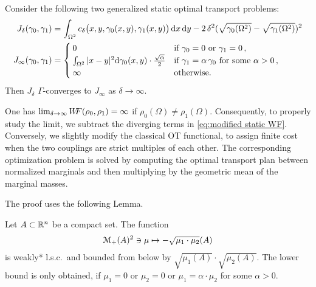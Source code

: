 \begin{theorem}
	\label{th:static gamma convergence}
	Consider the following two generalized static optimal transport problems:
	\begin{align}
		\label{eq:modified static WF}
		J_\delta(\gamma_0,\gamma_1) & = \int_{\Omega^2} c_\delta \big(x,y,\gamma_0(x,y),\gamma_1(x,y) \big)
			\,\mathrm{d} x\,\mathrm{d} y - 2\,\delta^2 (\sqrt{\gamma_0(\Omega^2)}-\sqrt{\gamma_1(\Omega^2)})^2 \\
		J_\infty(\gamma_0,\gamma_1) & = \begin{cases}
			0 & \text{if } \gamma_0=0 \text{ or } \gamma_1 = 0\,, \\
			\int_{\Omega^2} |x-y|^2 \mathrm{d}\gamma_0(x,y) \cdot  \frac{\sqrt{\alpha}}{2} & \text{if } \gamma_1 = \alpha \, \gamma_0 \text{ for some } \alpha>0 \,, \\
			\infty & \text{otherwise.}
			\end{cases}
	\end{align}
	Then $J_\delta$ $\Gamma$-converges to $J_\infty$ as $\delta \rightarrow \infty$.
\end{theorem}
\begin{remark}
	One has $\lim_{\delta \rightarrow \infty} W\! \! F(\rho_0,\rho_1) = \infty$ if $\rho_0(\Omega) \neq \rho_1(\Omega)$. Consequently, to properly study the limit, we subtract the diverging terms in \eqref{eq:modified static WF}. Conversely, we slightly modify the classical OT functional, to assign finite cost when the two couplings are strict multiples of each other. The corresponding optimization problem is solved by computing the optimal transport plan between normalized marginals and then multiplying by the geometric mean of the marginal masses.
\end{remark}
%
\noindent The proof uses the following Lemma.
\begin{lemma}
	\label{lemma:SqrtMeasure1}
Let $A \subset \mathbb{R}^n$ be a compact set. The function
\begin{align}
	\mathcal{M}_+(A)^2 \ni \mu \mapsto -\sqrt{\mu_1 \cdot \mu_2}(A)
\end{align}
is weakly* l.s.c.\ and bounded from below by $\sqrt{\mu_1(A)} \cdot \sqrt{\mu_2(A)}$. The lower bound is only obtained, if $\mu_1=0$ or $\mu_2=0$ or $\mu_1 = \alpha \cdot \mu_2$ for some $\alpha > 0$.
\end{lemma}
